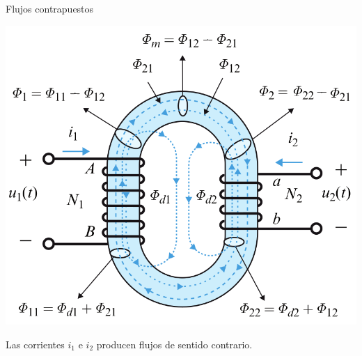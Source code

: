 \documentclass[xcolor={usenames,svgnames,dvipsnames}]{beamer}
\begin{document}
\begin{frame}[label={sec:org23401c7}]{Flujos contrapuestos}
\begin{center}
\includegraphics[height=0.9\textheight]{figs/Acoplamiento2.png}
\end{center}

Las corrientes \(i_1\) e \(i_2\) producen flujos de sentido contrario.
\end{frame}
\end{document}
